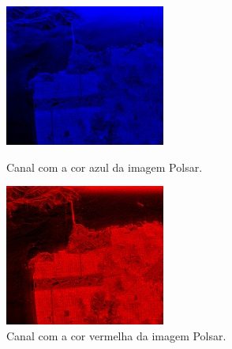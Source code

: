\documentclass[12pt,a4paper]{article}
\begin{document}
\begin{figure}[!htb]
\begin{minipage}[b]{0.450\linewidth}
\includegraphics[width=\linewidth]{polsar_blue.jpeg}
\caption{Canal com a cor azul da imagem Polsar.}
\label{fig5:sobel}
\end{minipage}\hfill
\begin{minipage}[b]{0.450\linewidth}
\includegraphics[width=\linewidth]{polsar_red.jpeg}
\caption{Canal com a cor vermelha da imagem Polsar.}
\label{fig5:Log}
\end{minipage}
\end{figure}
\end{document}
